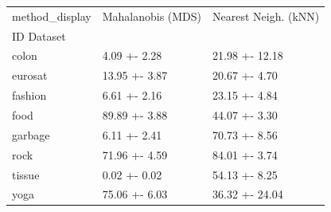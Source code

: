 \begin{tabular}{lll}
\toprule
method_display & Mahalanobis (MDS) & Nearest Neigh. (kNN) \\
ID Dataset &  &  \\
\midrule
colon & 4.09 +- 2.28 & 21.98 +- 12.18 \\
eurosat & 13.95 +- 3.87 & 20.67 +- 4.70 \\
fashion & 6.61 +- 2.16 & 23.15 +- 4.84 \\
food & 89.89 +- 3.88 & 44.07 +- 3.30 \\
garbage & 6.11 +- 2.41 & 70.73 +- 8.56 \\
rock & 71.96 +- 4.59 & 84.01 +- 3.74 \\
tissue & 0.02 +- 0.02 & 54.13 +- 8.25 \\
yoga & 75.06 +- 6.03 & 36.32 +- 24.04 \\
\bottomrule
\end{tabular}
